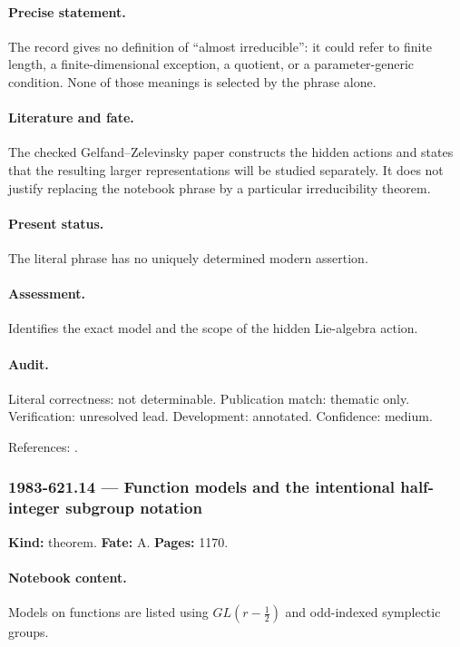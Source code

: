 \paragraph{Precise statement.} The record gives no definition of “almost irreducible”: it could refer to finite length, a finite-dimensional exception, a quotient, or a parameter-generic condition. None of those meanings is selected by the phrase alone.

\paragraph{Literature and fate.} The checked Gelfand–Zelevinsky paper constructs the hidden actions and states that the resulting larger representations will be studied separately. It does not justify replacing the notebook phrase by a particular irreducibility theorem.

\paragraph{Present status.} The literal phrase has no uniquely determined modern assertion.

\paragraph{Assessment.} Identifies the exact model and the scope of the hidden Lie-algebra action.

\paragraph{Audit.} Literal correctness: not determinable. Publication match: thematic only. Verification: unresolved lead. Development: annotated. Confidence: medium.

\noindent References: \citep{gelfandzelevinsky1984models}.\par

\subsubsection{1983-621.14 --- Function models and the intentional half-integer subgroup notation}

\label{item:1983-621.14}

\noindent\textbf{Kind:} theorem. \textbf{Fate:} A. \textbf{Pages:} 1170.\par

\paragraph{Notebook content.} Models on functions are listed using \(GL(r-\tfrac12)\) and odd-indexed symplectic groups.

